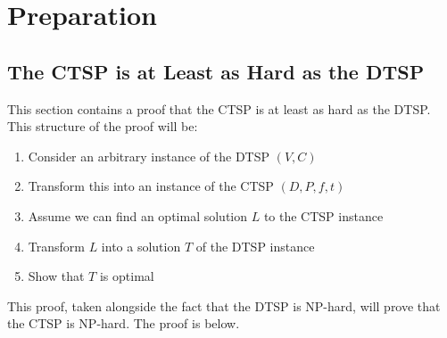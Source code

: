 \chapter{Preparation}

\section{The CTSP is at Least as Hard as the DTSP}

This section contains a proof that the CTSP is at least as hard as the DTSP. This structure of the proof will be:
\begin{enumerate}
  \item Consider an arbitrary instance of the DTSP $(V,C)$
  \item Transform this into an instance of the CTSP $(D,P,f,t)$
  \item Assume we can find an optimal solution $L$ to the CTSP instance
  \item Transform $L$ into a solution $T$ of the DTSP instance
  \item Show that $T$ is optimal
\end{enumerate}

This proof, taken alongside the fact that the DTSP is NP-hard\cite{Korte2008}, will prove that the CTSP is NP-hard. The proof is below.

